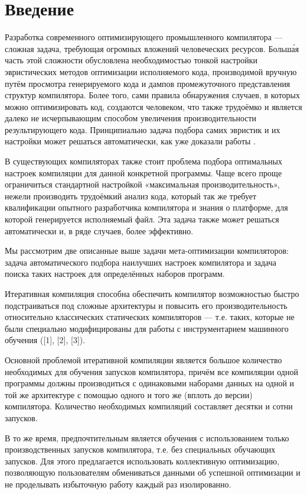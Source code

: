 \chapter{Введение}
Разработка современного оптимизирующего промышленного компилятора --- сложная задача, требующая огромных вложений человеческих ресурсов. Больш\'{а}я часть этой сложности обусловлена необходимостью тонкой настройки эвристических методов оптимизации исполняемого кода, производимой вручную путём просмотра генерируемого кода и дампов промежуточного представления структур компилятора. Более того, сами правила обнаружения случаев, в которых можно оптимизировать код, создаются человеком, что также трудоёмко и является далеко не исчерпывающим способом увеличения производительности результирующего кода. Принципиально задача подбора самих эвристик и их настройки может решаться автоматически, как уже доказали работы {}.

В существующих компиляторах также стоит проблема подбора оптимальных настроек компиляции для данной конкретной программы. Чаще всего проще ограничиться стандартной настройкой «максимальная производительность», нежели производить трудоёмкий анализ кода, который так же требует квалификации опытного разработчика компилятора и знания о платформе, для которой генерируется исполняемый файл. Эта задача также может решаться автоматически и, в ряде случаев, более эффективно.

Мы рассмотрим две описанные выше задачи мета-оптимизации компиляторов: задача автоматического подбора наилучших настроек компилятора и задача поиска таких настроек для определённых наборов программ.

Итеративная компиляция способна обеспечить компилятор возможностью быстро подстраиваться под сложные архитектуры и повысить его производительность относительно классических статических компиляторов — т.е. таких, которые не были специально модифицированы для работы с инструментарием машинного обучения ([1], [2], [3]).

Основной проблемой итеративной компиляции является большое количество необходимых для обучения запусков компилятора, причём все компиляции одной программы должны производиться с одинаковыми наборами данных на одной и той же архитектуре с помощью одного и того же (вплоть до версии) компилятора. Количество необходимых компиляций составляет десятки и сотни запусков.

В то же время, предпочтительным является обучения с использованием только производственных запусков компилятора, т.е. без специальных обучающих запусков. Для этого предлагается использовать коллективную оптимизацию, позволяющую пользователям обмениваться данными об успешной оптимизации и не проделывать избыточную работу каждый раз изолированно.

